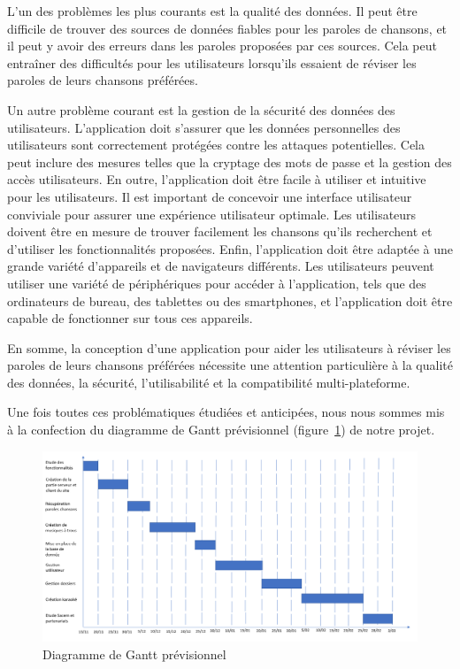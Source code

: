 \documentclass[12pt,french]{article}
\begin{document}
L'un des problèmes les plus courants est la qualité des données. Il peut être difficile de trouver des sources de données fiables pour les paroles de chansons, et il peut y avoir des erreurs dans les paroles proposées par ces sources. Cela peut entraîner des difficultés pour les utilisateurs lorsqu'ils essaient de réviser les paroles de leurs chansons préférées.
\newline

Un autre problème courant est la gestion de la sécurité des données des utilisateurs. L'application doit s'assurer que les données personnelles des utilisateurs sont correctement protégées contre les attaques potentielles. Cela peut inclure des mesures telles que la cryptage des mots de passe et la gestion des accès utilisateurs.
En outre, l'application doit être facile à utiliser et intuitive pour les utilisateurs. Il est important de concevoir une interface utilisateur conviviale pour assurer une expérience utilisateur optimale. Les utilisateurs doivent être en mesure de trouver facilement les chansons qu'ils recherchent et d'utiliser les fonctionnalités proposées.
\newline
Enfin, l'application doit être adaptée à une grande variété d'appareils et de navigateurs différents. Les utilisateurs peuvent utiliser une variété de périphériques pour accéder à l'application, tels que des ordinateurs de bureau, des tablettes ou des smartphones, et l'application doit être capable de fonctionner sur tous ces appareils.
\newline

En somme, la conception d'une application pour aider les utilisateurs à réviser les paroles de leurs chansons préférées nécessite une attention particulière à la qualité des données, la sécurité, l'utilisabilité et la compatibilité multi-plateforme.
\newline
\newline

Une fois toutes ces problématiques étudiées et anticipées, nous nous sommes mis à la confection du diagramme de Gantt prévisionnel (figure~\ref{figure2}) de notre projet.



\begin{figure}[H]
	\centering
	\includegraphics[scale=0.5]{ganttprevi.png}
	\caption{Diagramme de Gantt prévisionnel}  
	\label{figure2}   
\end{figure}
\end{document}
